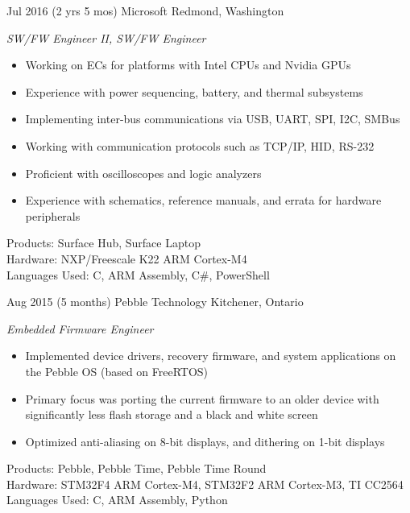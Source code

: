 \documentclass[print]{friggeri-cv} %
\begin{document}
\begin{entrylist}
\entry
{Jul 2016}
{(2 yrs 5 mos)}
{Microsoft}
{Redmond, Washington}
{\emph{SW/FW Engineer II, SW/FW Engineer}
\begin{itemize}
\item Working on ECs for platforms with Intel CPUs and Nvidia GPUs
\item Experience with power sequencing, battery, and thermal subsystems
\item Implementing inter-bus communications via USB, UART, SPI, I2C, SMBus
\item Working with communication protocols such as TCP/IP, HID, RS-232
\item Proficient with oscilloscopes and logic analyzers
\item Experience with schematics, reference manuals, and errata for hardware peripherals
\end{itemize}
Products: Surface Hub, Surface Laptop \\
Hardware: NXP/Freescale K22 ARM Cortex-M4 \\
Languages Used: C, ARM Assembly, C\#, PowerShell \\
}

\entry
{Aug 2015}
{(5 months)}
{Pebble Technology}
{Kitchener, Ontario}
{\emph{Embedded Firmware Engineer}
\begin{itemize}
\item Implemented device drivers, recovery firmware, and system applications on the Pebble OS (based on FreeRTOS)
\item Primary focus was porting the current firmware to an older device with significantly less flash storage and a black and white screen
\item Optimized anti-aliasing on 8-bit displays, and dithering on 1-bit displays
\end{itemize}
Products: Pebble, Pebble Time, Pebble Time Round \\
Hardware: STM32F4 ARM Cortex-M4, STM32F2 ARM Cortex-M3, TI CC2564 \\
Languages Used: C, ARM Assembly, Python \\
}

\end{entrylist}

\goodbreak
{}
\renewcommand{\entry}[5]{%
  \parbox[t]{1.4cm}{\footnotesize \textbf{#1} \\ \scriptsize\addfontfeature{Color=lightgray} #2}&\parbox[t]{18.0cm}{%
    \textbf{#3}%
    \hfill%
    {\footnotesize\addfontfeature{Color=lightgray} #4}%
    \justify #5\vspace{\parsep}%
  }\\}
\end{document}
